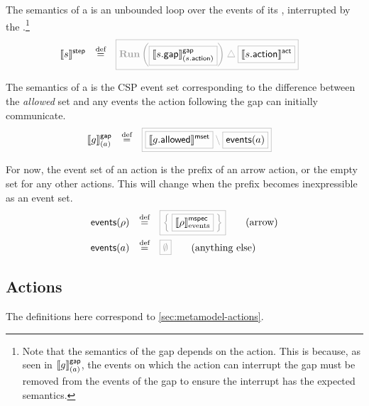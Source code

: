 \todo{\msequencestep}

\begin{definition}[\mactionstep]

The semantics of a \mactionstep{} is an unbounded loop over the events of its
\msequencegap, interrupted by the \msequenceaction.\footnote{Note that the semantics of the gap depends
on the action.  This is because, as seen in \(\llbracket g \rrbracket^{\mathsf{gap}}_{(a)}\),
the events on which the action can interrupt the
gap must be removed from the events of the gap to ensure the interrupt has the
expected semantics.}
%
\begin{align*}
	\stepsema{\astep}
\quad\defeq\quad&	
	\tlang{
		\runproc{\olang{\gapsema{\field{\astep}{gap}}{\field{\astep}{action}}}}
		\interrupt \olang{\actsema{\field{\astep}{action}}}
	}
\end{align*}
\end{definition}

\begin{definition}[\msequencegap]
	The semantics of a \msequencegap{} is the CSP event set corresponding to
	the difference between the \emph{allowed} set and any events
	the action following the gap can initially communicate.
%
\begin{align*}
	\gapsema{
		\agap
	}{\anaction}
\quad\defeq\quad&
\tlang{
	\olang{\msgsetsema{\field{\agap}{allowed}}}
	\setminus
	\olang{\eventsOf{\anaction}}
}
\end{align*}
\end{definition}

\begin{definition}
For now, the event set of an action is the prefix of an arrow action, or
the empty set for any other actions.  This will change when the prefix becomes
inexpressible as an event set.
%
\begin{align*}
	\eventsOf{\anarrow}
\quad\defeq\quad&
	\tlang{\Set{\olang{\emspecsema{\anarrow}}}}
	\tag{arrow}
\\
	\eventsOf{\anaction}
\quad\defeq\quad&
	\tlang{\emptyset}
	\tag{anything else}
\end{align*}
\end{definition}

\subsection{Actions}\label{ssec:semantics-tockcsp-actions}

The definitions here correspond to \cref{sec:metamodel-actions}.

